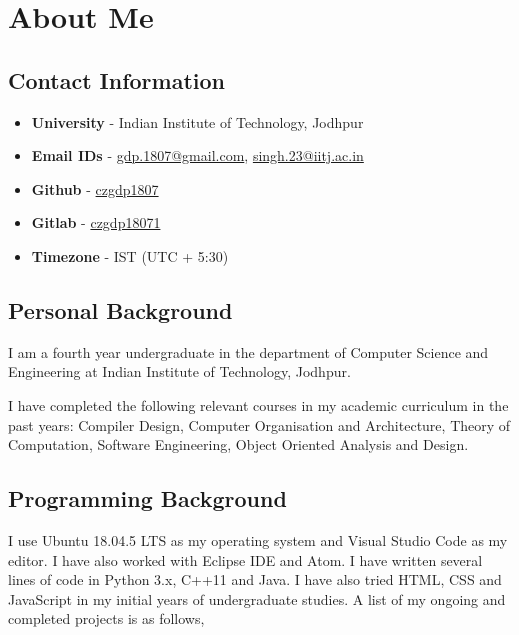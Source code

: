 \section{About Me}


\subsection{Contact Information}

\begin{itemize}

    \item \textbf{University} - Indian Institute of Technology, Jodhpur
    
    \item \textbf{Email IDs} - \href{mailto:gdp.1807@gmail.com}{gdp.1807@gmail.com}, \href{mailto:singh.23@iitj.ac.in}{singh.23@iitj.ac.in}
    
    \item \textbf{Github} - \href{https://github.com/czgdp1807}{czgdp1807}
    
    \item \textbf{Gitlab} - \href{https://gitlab.com/czgdp18071}{czgdp18071}
    
    \item \textbf{Timezone} - IST (UTC + 5:30)

\end{itemize}

\subsection{Personal Background}

I am a fourth year undergraduate in the department of Computer Science and Engineering at Indian Institute of Technology, Jodhpur.

I have completed the following relevant courses in my academic curriculum in the past years: Compiler Design, Computer Organisation and Architecture, Theory of Computation, Software Engineering, Object Oriented Analysis and Design.

\subsection{Programming Background}

I use Ubuntu 18.04.5 LTS as my operating system and Visual Studio Code as my editor. I have also worked with Eclipse IDE and Atom. I have written several lines of code in Python 3.x, C++11 and Java. I have also tried HTML, CSS and JavaScript in my initial years of undergraduate studies. A list of my ongoing and completed projects is as follows,

